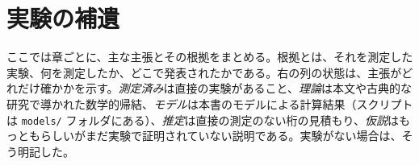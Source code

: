 \chapter{実験の補遺}
\label{sec:supplement}

ここでは章ごとに、主な主張とその根拠をまとめる。根拠とは、それを測定した実験、何を測定したか、どこで発表されたかである。右の列の状態は、主張がどれだけ確かかを示す。\emph{測定済み}は直接の実験があること、\emph{理論}は本文や古典的な研究で導かれた数学的帰結、\emph{モデル}は本書のモデルによる計算結果（スクリプトは \texttt{models/} フォルダにある）、\emph{推定}は直接の測定のない桁の見積もり、\emph{仮説}はもっともらしいがまだ実験で証明されていない説明である。実験がない場合は、そう明記した。























